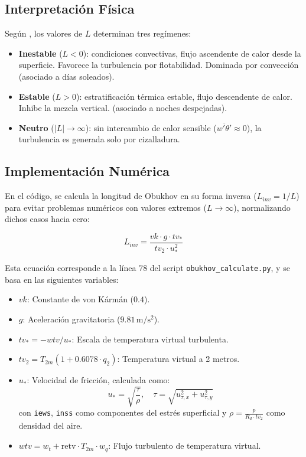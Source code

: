 \documentclass[11pt]{article}
\begin{document}
\subsection{Interpretación Física}
Según \citep{ecmwf_obukhov_era5_guide}, los valores de $L$ determinan tres regímenes:
%

\begin{itemize}
    \item \textbf{Inestable} ($L < 0$): condiciones convectivas, flujo ascendente de calor desde la superficie. Favorece la turbulencia por flotabilidad. Dominada por convección (asociado a días soleados).
    
    \item \textbf{Estable} ($L > 0$): estratificación térmica estable, flujo descendente de calor. Inhibe la mezcla vertical. (asociado a noches despejadas).

    \item \textbf{Neutro} ($|L| \to \infty$): sin intercambio de calor sensible ($\overline{w'\theta'} \approx 0$), la turbulencia es generada solo por cizalladura.
\end{itemize}
%
\subsection{Implementación Numérica}

En el código, se calcula la longitud de Obukhov en su forma inversa ($L_{inv} = 1/L$) para evitar problemas numéricos con valores extremos (\(L \to \infty\)), normalizando dichos casos hacia cero:

\begin{equation}
L_{inv} = \frac{vk \cdot g \cdot tv_{*}}{tv_2 \cdot u_*^2}
\end{equation}

Esta ecuación corresponde a la línea 78 del script \texttt{obukhov\_calculate.py}, y se basa en las siguientes variables:

\begin{itemize}
    \item $vk$: Constante de von Kármán (\(0.4\)).
    \item $g$: Aceleración gravitatoria (\(9.81\, \mathrm{m/s^2}\)).
    \item $tv_{*} = -wtv / u_*$: Escala de temperatura virtual turbulenta.
    \item $tv_2 = T_{2m}(1 + 0.6078 \cdot q_2)$: Temperatura virtual a 2 metros.
    \item $u_*$: Velocidad de fricción, calculada como:
    \[
    u_* = \sqrt{\frac{\tau}{\rho}}, \quad \tau = \sqrt{u_{\tau,x}^2 + u_{\tau,y}^2}
    \]
    con \texttt{iews}, \texttt{inss} como componentes del estrés superficial y \(\rho = \frac{p}{R_d \cdot tv_2}\) como densidad del aire.
    \item $wtv = w_t + \text{retv} \cdot T_{2m} \cdot w_q$: Flujo turbulento de temperatura virtual.
\end{itemize}
\end{document}
